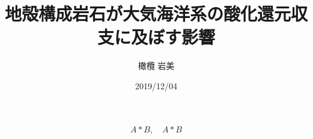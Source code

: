 \documentclass[a4paper,uplatex,dvipdfmx]{jsarticle}
\title{地殻構成岩石が大気海洋系の酸化還元収支に及ぼす影響}
\author{橄欖 岩美}
\date{2019/12/04}
\begin{document}
\begin{titlepage}
\epmaketitle
\thispagestyle{empty}
\end{titlepage}
\begin{equation}
A\ast B,\quad A*B
\end{equation}
\end{document}
